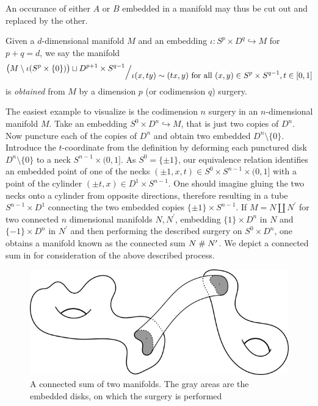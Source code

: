 An occurance of either $A$ or $B$ embedded in a manifold may thus be cut out and replaced by the other.
\begin{defi}[Surgery]
    Given a $d$-dimensional manifold $M$ and an embedding $\iota\colon S^p\times D^q \hookrightarrow M$ for $p+q=d$, we say the manifold
        \begin{equation*}
            \quotient{\big(M \setminus \iota(S^p\times\{0\})\big) \amalg D^{p+1}\times S^{q-1}}{\iota(x,ty) \sim (tx,y) \text{ for all } (x,y)\in S^p\times S^{q-1}, t\in[0,1]}
        \end{equation*}
    is \emph{obtained} from $M$ by a dimension $p$ (or codimension $q$) surgery.
\end{defi}
The easiest example to visualize is the codimension $n$ surgery in an $n$-dimensional manifold $M$.
Take an embedding $S^0\times D^n \hookrightarrow M$, that is just two copies of $D^n$.
Now puncture each of the copies of $D^n$ and obtain two embedded $D^n\setminus \{0\}$.
Introduce the $t$-coordinate from the definition by deforming each punctured disk $D^n\setminus\{0\}$ to a neck $S^{n-1}\times (0,1]$.
As $S^0 = \{\pm 1\}$, our equivalence relation identifies an embedded point of one of the necks $(\pm 1, x, t) \in S^0\times S^{n-1}\times (0,1]$ with a point of the cylinder $(\pm t, x) \in D^1\times S^{n-1}$.
One should imagine gluing the two necks onto a cylinder from opposite directions, therefore resulting in a tube $S^{n-1}\times D^1$ connecting the two embedded copies $\{\pm 1\}\times S^{n-1}$.
If $M = N \amalg N^\prime$ for two connected $n$ dimensional manifolds $N,N^\prime$, embedding $\{1\}\times D^n$ in $N$ and $\{-1\}\times D^n$ in $N^\prime$ and then performing the described surgery on $S^0\times D^n$, one obtains a manifold known as the connected sum $N\mathrel\# N^\prime$.
We depict a connected sum in  for consideration of the above described process.
\begin{figure}
    \centering
    \includegraphics[width=.8\textwidth]{img/connsum.png}
    \caption{A connected sum of two manifolds. The gray areas are the embedded disks, on which the surgery is performed}\label{fig:connsum}
\end{figure}
